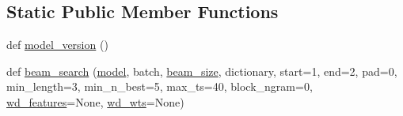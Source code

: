 \subsection*{Static Public Member Functions}
\begin{DoxyCompactItemize}
\item 
def \hyperlink{classprojects_1_1controllable__dialogue_1_1controllable__seq2seq_1_1controllable__seq2seq_1_1ControllableSeq2seqAgent_ab10efe928769fe5a7d398930e1d5174c}{model\+\_\+version} ()
\item 
def \hyperlink{classprojects_1_1controllable__dialogue_1_1controllable__seq2seq_1_1controllable__seq2seq_1_1ControllableSeq2seqAgent_aabb638a2dd4fd89320f1904d5b0579f1}{beam\+\_\+search} (\hyperlink{classprojects_1_1controllable__dialogue_1_1controllable__seq2seq_1_1controllable__seq2seq_1_1ControllableSeq2seqAgent_ad3004224cdb878412a74b89f7f00412e}{model}, batch, \hyperlink{classprojects_1_1controllable__dialogue_1_1controllable__seq2seq_1_1controllable__seq2seq_1_1ControllableSeq2seqAgent_a3bdf0be087cbd26a34badd3cb619e480}{beam\+\_\+size}, dictionary, start=1, end=2, pad=0, min\+\_\+length=3, min\+\_\+n\+\_\+best=5, max\+\_\+ts=40, block\+\_\+ngram=0, \hyperlink{classprojects_1_1controllable__dialogue_1_1controllable__seq2seq_1_1controllable__seq2seq_1_1ControllableSeq2seqAgent_ae7d42c61a184691bb15d1ea65aee4c72}{wd\+\_\+features}=None, \hyperlink{classprojects_1_1controllable__dialogue_1_1controllable__seq2seq_1_1controllable__seq2seq_1_1ControllableSeq2seqAgent_a74800af89333cc27f221ed70dff41e4e}{wd\+\_\+wts}=None)
\end{DoxyCompactItemize}
